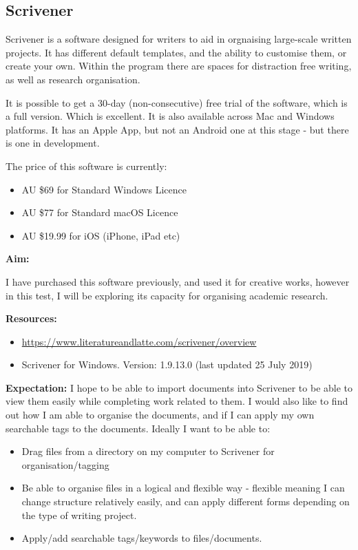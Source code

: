\documentclass{article}
\begin{document}
\subsection{Scrivener}

Scrivener is a software designed for writers to aid in orgnaising large-scale written projects. It has different default templates, and the ability to customise them, or create your own. Within the program there are spaces for distraction free writing, as well as research organisation. 

It is possible to get a 30-day (non-consecutive) free trial of the software, which is a full version. Which is excellent. It is also available across Mac and Windows platforms. It has an Apple App, but not an Android one at this stage - but there is one in development.

The price of this software is currently: 

\begin{itemize}
    \item AU \$69 for Standard Windows Licence
    \item AU \$77 for Standard macOS Licence
    \item AU \$19.99 for iOS (iPhone, iPad etc)
\end{itemize}

\textbf{Aim:}

I have purchased this software previously, and used it for creative works, however in this test, I will be exploring its capacity for organising academic research.

\textbf{Resources:}
\begin{itemize}
    \item \url{https://www.literatureandlatte.com/scrivener/overview}
    \item Scrivener for Windows. Version: 1.9.13.0 (last updated 25 July 2019)
\end{itemize}

\textbf{Expectation:}
I hope to be able to import documents into Scrivener to be able to view them easily while completing work related to them. I would also like to find out how I am able to organise the documents, and if I can apply my own searchable tags to the documents.
Ideally I want to be able to:
\begin{itemize}
    \item Drag files from a directory on my computer to Scrivener for organisation/tagging
    \item Be able to organise files in a logical and flexible way - flexible meaning I can change structure relatively easily, and can apply different forms depending on the type of writing project.
    \item Apply/add searchable tags/keywords to files/documents.
\end{itemize}
\end{document}
